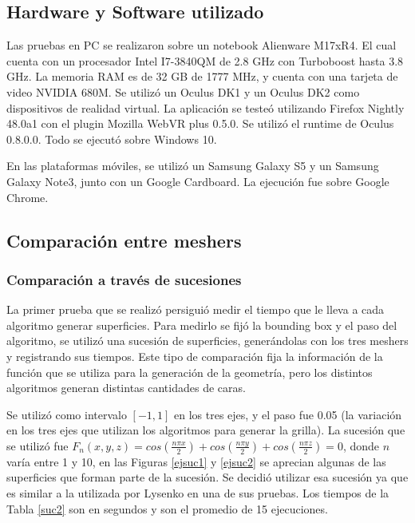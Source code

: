 \documentclass[12pt]{article}
\begin{document}
\subsection{Hardware y Software utilizado}
\noindent Las pruebas en PC se realizaron sobre un notebook Alienware M17xR4. El cual cuenta con un procesador Intel I7-3840QM de 2.8 GHz con Turboboost hasta 3.8 GHz. La memoria RAM es de 32 GB de 1777 MHz, y cuenta con una tarjeta de video NVIDIA 680M. Se utilizó un Oculus DK1 y un Oculus DK2 como dispositivos de realidad virtual. La aplicación se testeó utilizando Firefox Nightly 48.0a1 con el plugin Mozilla WebVR plus 0.5.0. Se utilizó el runtime de Oculus 0.8.0.0. Todo se ejecutó sobre Windows 10.

En las plataformas móviles, se utilizó un Samsung  Galaxy S5 y un Samsung  Galaxy Note3, junto con un Google Cardboard. La ejecución fue sobre Google Chrome.

\subsection{Comparación entre meshers}
\subsubsection{Comparación a través de sucesiones}
\noindent La primer prueba que se realizó persiguió medir el tiempo que le lleva a cada algoritmo generar superficies. Para medirlo se fijó la bounding box y el paso del algoritmo, se utilizó una sucesión de superficies, generándolas con los tres meshers y registrando sus tiempos. Este tipo de comparación fija la información de la función que se utiliza para la generación de la geometría, pero los distintos algoritmos generan distintas cantidades de caras.

Se utilizó como intervalo $[-1,1]$ en los tres ejes, y el paso fue 0.05 (la variación en los tres ejes que utilizan los algoritmos para generar la grilla). La sucesión que se utilizó fue $F_n(x,y,z) = cos(\frac{n\pi x}{2}) + cos(\frac{n\pi y}{2}) +cos(\frac{n\pi z}{2}) =0$, donde $n$ varía entre 1 y 10, en las Figuras \ref{ejsuc1} y \ref{ejsuc2} se aprecian algunas de las superficies que forman parte de la sucesión. Se decidió utilizar esa sucesión ya que es similar a la utilizada por Lysenko en una de sus pruebas. Los tiempos de la Tabla \ref{suc2} son en segundos y son el promedio de 15 ejecuciones.\\\\\\\\\\
\end{document}
